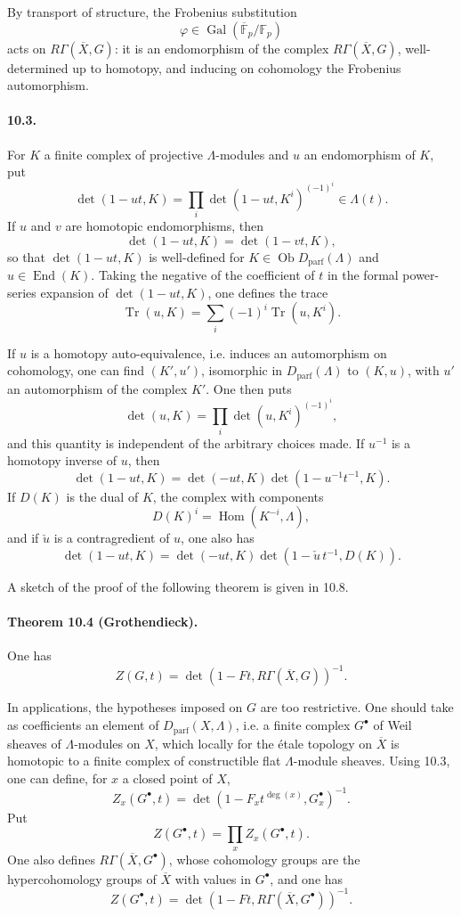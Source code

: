 \documentclass[10pt]{article}
\newcommand{\F}{\mathbb F}
\newcommand{\Gal}{\operatorname{Gal}}
\newcommand{\Hom}{\operatorname{Hom}}
\newcommand{\Tr}{\operatorname{Tr}}
\providecommand{\Gal}{\operatorname{Gal}}
\providecommand{\Hom}{\operatorname{Hom}}
\providecommand{\End}{\operatorname{End}}
\providecommand{\Gal}{\operatorname{Gal}}
\providecommand{\Hom}{\operatorname{Hom}}
\providecommand{\Tr}{\operatorname{Tr}}
\providecommand{\Dparf}{D_{\mathrm{parf}}}
\providecommand{\Gal}{\operatorname{Gal}}
\providecommand{\Hom}{\operatorname{Hom}}
\providecommand{\End}{\operatorname{End}}
\providecommand{\Tr}{\operatorname{Tr}}
\providecommand{\Gal}{\operatorname{Gal}}
\providecommand{\Tr}{\operatorname{Tr}}
\begin{document}
By transport of structure, the Frobenius substitution
\[
\varphi\in\Gal(\overline{\F}_p/\F_p)
\]
acts on \(R\Gamma(\overline X,G)\): it is an endomorphism of the complex \(R\Gamma(\overline X,G)\), well-determined up to homotopy, and inducing on cohomology the Frobenius automorphism.

\paragraph{10.3.} For \(K\) a finite complex of projective \(\Lambda\)-modules and \(u\) an endomorphism of \(K\), put
\[
\tag{10.3.1}
\det(1-ut,K)=
\prod_i\det(1-ut,K^i)^{(-1)^i}\in\Lambda(t).
\]
If \(u\) and \(v\) are homotopic endomorphisms, then
\[
\det(1-ut,K)=\det(1-vt,K),
\]
so that \(\det(1-ut,K)\) is well-defined for \(K\in\operatorname{Ob}\Dparf(\Lambda)\) and \(u\in\End(K)\). Taking the negative of the coefficient of \(t\) in the formal power-series expansion of \(\det(1-ut,K)\), one defines the trace
\[
\tag{10.3.2}
\Tr(u,K)=\sum_i(-1)^i\Tr(u,K^i).
\]

If \(u\) is a homotopy auto-equivalence, i.e. induces an automorphism on cohomology, one can find \((K',u')\), isomorphic in \(\Dparf(\Lambda)\) to \((K,u)\), with \(u'\) an automorphism of the complex \(K'\). One then puts
\[
\tag{10.3.3}
\det(u,K)=\prod_i\det(u,K^i)^{(-1)^i},
\]
and this quantity is independent of the arbitrary choices made. If \(u^{-1}\) is a homotopy inverse of \(u\), then
\[
\tag{10.3.4}
\det(1-ut,K)=\det(-ut,K)\det(1-u^{-1}t^{-1},K).
\]
If \(D(K)\) is the dual of \(K\), the complex with components
\[
D(K)^i=\Hom(K^{-i},\Lambda),
\]
and if \(\check u\) is a contragredient of \(u\), one also has
\[
\tag{10.3.5}
\det(1-ut,K)=\det(-ut,K)\det(1-\check u\,t^{-1},D(K)).
\]

A sketch of the proof of the following theorem is given in 10.8.

\paragraph{Theorem 10.4 (Grothendieck).} One has
\[
\tag{10.4.1}
Z(G,t)=\det(1-Ft,R\Gamma(\overline X,G))^{-1}.
\]

In applications, the hypotheses imposed on \(G\) are too restrictive. One should take as coefficients an element of \(\Dparf(X,\Lambda)\), i.e. a finite complex \(G^\bullet\) of Weil sheaves of \(\Lambda\)-modules on \(X\), which locally for the étale topology on \(\overline X\) is homotopic to a finite complex of constructible flat \(\Lambda\)-module sheaves. Using 10.3, one can define, for \(x\) a closed point of \(X\),
\[
Z_x(G^\bullet,t)=
\det(1-F_x t^{\deg(x)},G_x^\bullet)^{-1}.
\]
Put
\[
Z(G^\bullet,t)=\prod_x Z_x(G^\bullet,t).
\]
One also defines \(R\Gamma(\overline X,G^\bullet)\), whose cohomology groups are the hypercohomology groups of \(\overline X\) with values in \(G^\bullet\), and one has
\[
\tag{10.4.2}
Z(G^\bullet,t)=
\det(1-Ft,R\Gamma(\overline X,G^\bullet))^{-1}.
\]
\end{document}
